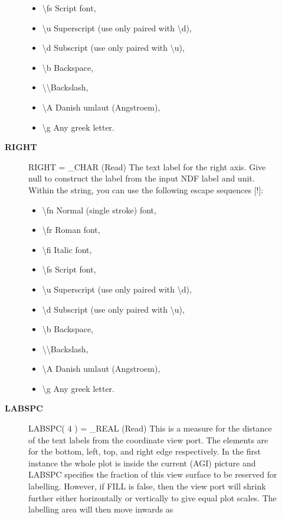 \begin{description}
\begin{description}
\begin{itemize}
   \item \textbackslash fs Script font,
   \item \textbackslash u  Superscript (use only paired with \textbackslash d),
   \item \textbackslash d  Subscript (use only paired with \textbackslash u),
   \item \textbackslash b  Backspace,
   \item \textbackslash \textbackslash   Backslash,
   \item \textbackslash A  Danish umlaut (Angstroem),
   \item \textbackslash g  Any greek letter.
   \end{itemize}
\item [\textbf{RIGHT}]
RIGHT = \_CHAR (Read)
   The text label for the right axis. Give null to construct the
   label from the input NDF label and unit. Within the string, you
   can use the following escape sequences [!]:
   \begin{itemize}
   \item \textbackslash fn Normal (single stroke) font,
   \item \textbackslash fr Roman font,
   \item \textbackslash fi Italic font,
   \item \textbackslash fs Script font,
   \item \textbackslash u  Superscript (use only paired with \textbackslash d),
   \item \textbackslash d  Subscript (use only paired with \textbackslash u),
   \item \textbackslash b  Backspace,
   \item \textbackslash \textbackslash   Backslash,
   \item \textbackslash A  Danish umlaut (Angstroem),
   \item \textbackslash g  Any greek letter.
   \end{itemize}
\item [\textbf{LABSPC}]
LABSPC( 4 ) = \_REAL (Read)
   This is a measure for the distance of the text labels from the
   coordinate view port. The elements are for the bottom, left,
   top, and right edge respectively. In the first instance the
   whole plot is inside the current (AGI) picture and LABSPC
   specifies the fraction of this view surface to be reserved for
   labelling. However, if FILL is false, then the view port will
   shrink further either horizontally or vertically to give equal
   plot scales. The labelling area will then move inwards as

\end{description}
\end{description}

